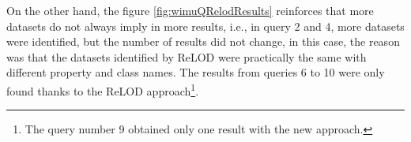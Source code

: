 On the other hand, the figure \ref{fig:wimuQRelodResults} reinforces that more datasets do not always imply in more results, i.e., in query 2 and 4, more datasets were identified, but the number of results did not change, in this case, the reason was that the datasets identified by ReLOD were practically the same with different property and class names. The results from queries 6 to 10 were only found thanks to the ReLOD approach\footnote{The query number 9 obtained only one result with the new approach.}.
